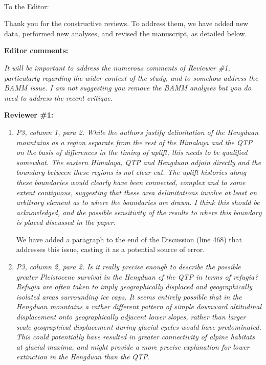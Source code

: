 \documentclass[11pt]{letter}
\begin{document}
\raggedright{}


\begin{letter}{ \\

}
\address{Integrative Research Center\\
  The Field Museum\\
  1400 South Lake Shore Drive\\
  Chicago, IL  60605-2496\\
  USA}

\opening{To the Editor:}

Thank you for the constructive reviews. To address them, we have added
new data, performed new analyses, and revised the manuscript, as
detailed below.


\textbf{Editor comments:}

\textit{It will be important to address the numerous comments of
  Reviewer \#1, particularly regarding the wider context of the study,
  and to somehow address the BAMM issue. I am not suggesting you
  remove the BAMM analyses but you do need to address the recent
  critique.}

\textbf{Reviewer \#1:}

\begin{enumerate}
\item \textit{P3, column 1, para 2. While the authors justify
    delimitation of the Hengduan mountains as a region separate from
    the rest of the Himalaya and the QTP on the basis of differences
    in the timing of uplift, this needs to be qualified somewhat. The
    eastern Himalaya, QTP and Hengduan adjoin directly and the
    boundary between these regions is not clear cut. The uplift
    histories along these boundaries would clearly have been
    connected, complex and to some extent contiguous, suggesting that
    these area delimitations involve at least an arbitrary element as
    to where the boundaries are drawn. I think this should be
    acknowledged, and the possible sensitivity of the results to where
    this boundary is placed discussed in the paper.}

  We have added a paragraph to the end of the Discussion (line 468)
  that addresses this issue, casting it as a potential source of
  error.

\item \textit{P3, column 2, para 2. Is it really precise enough to
    describe the possible greater Pleistocene survival in the Hengduan
    cf the QTP in terms of refugia? Refugia are often taken to imply
    geographically displaced and geographically isolated areas
    surrounding ice caps. It seems entirely possible that in the
    Hengduan mountains a rather different pattern of simple downward
    altitudinal displacement onto geographically adjacent lower
    slopes, rather than larger scale geographical displacement during
    glacial cycles would have predominated. This could potentially
    have resulted in greater connectivity of alpine habitats at
    glacial maxima, and might provide a more precise explanation for
    lower extinction in the Hengduan than the QTP.}


\end{enumerate}
\end{letter}
\end{document}
